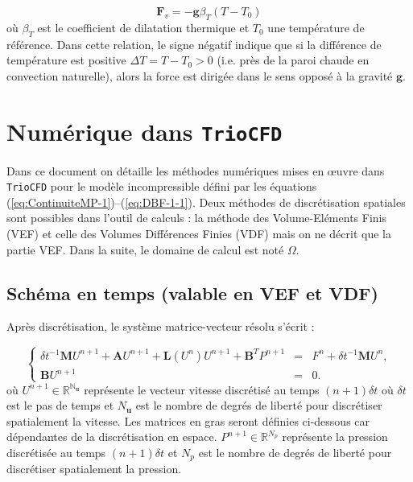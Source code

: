 \begin{equation}
\mathbf{F}_{v}=-\mathbf{g}\beta_{T}(T-T_{0})\label{eq:ApproxBoussinesq}
\end{equation}
o\`u $\beta_{T}$ est le coefficient de dilatation thermique et $T_{0}$
une temp\'erature de r\'ef\'erence. Dans cette relation, le signe n\'egatif
indique que si la diff\'erence de temp\'erature est positive $\Delta T=T-T_{0}>0$
(i.e. pr\`es de la paroi chaude en convection naturelle), alors la force
est dirig\'ee dans le sens oppos\'e \`a la gravit\'e $\mathbf{g}$.


\chapter{\label{sub:Numerique-dans-TrioCFD}Num\'erique dans \texttt{TrioCFD}}
Dans ce document on d\'etaille les m\'ethodes num\'eriques mises en \oe uvre
dans \texttt{TrioCFD} pour le mod\`ele incompressible d\'efini par les
\'equations (\ref{eq:ContinuiteMP-1})--(\ref{eq:DBF-1-1}). Deux m\'ethodes
de discr\'etisation spatiales sont possibles dans l'outil de calculs
: la m\'ethode des Volume-El\'ements Finis (VEF) et celle des Volumes
Diff\'erences Finies (VDF) mais on ne d\'ecrit que la partie VEF. Dans
la suite, le domaine de calcul est not\'e $\Omega$.


\section{Sch\'ema en temps (valable en VEF et VDF)}

Apr\`es discr\'etisation, le syst\`eme matrice-vecteur r\'esolu s'\'ecrit :

\begin{equation}
\left\{ \begin{array}{rcl}
\delta t^{-1}\mathbf{M}U^{n+1}+\mathbf{A}U^{n+1}+\mathbf{L}(U^{n})U^{n+1}+\mathbf{B}^{T}P^{n+1} & = & F^{n}+\delta t^{-1}\mathbf{M}U^{n},\\
\mathbf{B}U^{n+1} & = & 0.
\end{array}\right.\label{eq:NavierStokes-dis-FV}
\end{equation}
o\`u $U^{n+1}\in\mathbb{R^{N_{\mathbf{u}}}}$ repr\'esente le vecteur
vitesse discr\'etis\'e au temps $(n+1)\delta t$ o\`u $\delta t$ est le
pas de temps et $N_{\mathbf{u}}$ est le nombre de degr\'es de libert\'e
pour discr\'etiser spatialement la vitesse. Les matrices en gras seront
d\'efinies ci-dessous car d\'ependantes de la discr\'etisation en espace.
$P^{n+1}\in\mathbb{R}^{N_{p}}$ repr\'esente la pression discr\'etis\'ee
au temps $(n+1)\delta t$ et $N_{p}$ est le nombre de degr\'es de libert\'e
pour discr\'etiser spatialement la pression.

